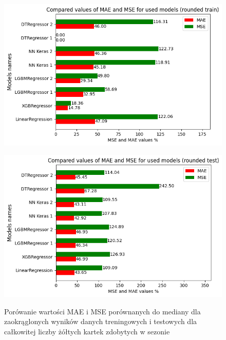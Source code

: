 \documentclass{article}
\begin{document}
\begin{figure}[H]
  \centering
  \begin{minipage}[b]{0.5\textwidth}
    \centering
    \includegraphics[width=\textwidth]{all_errors_11.png}
    \label{fig:all_errors_11}
  \end{minipage}%
  \begin{minipage}[b]{0.5\textwidth}
    \centering
    \includegraphics[width=\textwidth]{all_errors_12.png}
    \label{fig:all_errors_12}
  \end{minipage}
  \captionsetup{justification=centering}
  \caption{Porówanie wartości MAE i MSE porównanych do mediany dla zaokrąglonych wyników danych treningowych i testowych dla całkowitej liczby żółtych kartek zdobytych w sezonie}
  \label{fig:all_errors_3_2}
\end{figure}
\end{document}
